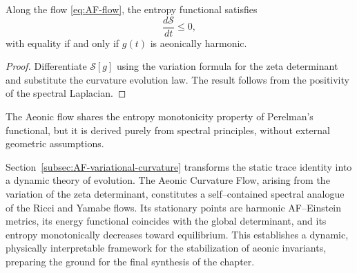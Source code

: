 \begin{proposition}
\label{prop:entropy-monotonicity}
Along the flow \eqref{eq:AF-flow},
the entropy functional satisfies
\[
\frac{d\mathcal{S}}{dt} \le 0,
\]
with equality if and only if \(g(t)\)
is aeonically harmonic.
\]
\end{proposition}

\begin{proof}
Differentiate \(\mathcal{S}[g]\)
using the variation formula for the zeta determinant
and substitute the curvature evolution law.
The result follows from the positivity of the spectral Laplacian.
\end{proof}

\begin{remark}
The Aeonic flow shares the entropy monotonicity property
of Perelman’s functional,
but it is derived purely from spectral principles,
without external geometric assumptions.
\end{remark}


\begin{remark}
Section~\ref{subsec:AF-variational-curvature}
transforms the static trace identity into a dynamic theory of evolution.
The Aeonic Curvature Flow,
arising from the variation of the zeta determinant,
constitutes a self–contained spectral analogue
of the Ricci and Yamabe flows.
Its stationary points are harmonic AF–Einstein metrics,
its energy functional coincides with the global determinant,
and its entropy monotonically decreases toward equilibrium.
This establishes a dynamic, physically interpretable framework
for the stabilization of aeonic invariants,
preparing the ground for the final synthesis of the chapter.
\end{remark}


